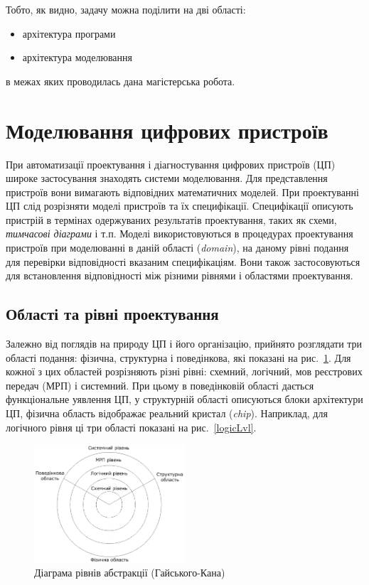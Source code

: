 \documentclass[12pt,a4paper]{article}
\begin{document}
Тобто, як видно, задачу можна поділити на дві області:
\begin{itemize}
  \item архітектура програми
  \item архітектура моделювання
\end{itemize}
в межах яких проводилась дана магістерська робота.

\clearpage

\section{Моделювання цифрових пристроїв}

При автоматизації проектування і діагностування цифрових пристроїв (ЦП) широке застосування знаходять системи моделювання. Для представлення пристроїв вони вимагають відповідних математичних моделей. При проектуванні ЦП слід розрізняти моделі пристроїв та їх специфікації. Специфікації описують пристрій в термінах одержуваних результатів проектування, таких як схеми, \emph{тимчасові діаграми} і т.п. Моделі використовуються в процедурах проектування пристроїв при моделюванні в даній області (\emph{domain}), на даному рівні подання для перевірки відповідності вказаним специфікаціям. Вони також застосовуються для встановлення відповідності між різними рівнями і областями проектування.

\subsection{Області та рівні проектування}

Залежно від поглядів на природу ЦП і його організацію, прийнято розглядати три області подання: фізична, структурна і поведінкова, які показані на рис.~\ref{abstrLvlDiag}. Для кожної з цих областей розрізняють різні рівні: схемний, логічний, мов реєстрових передач (МРП) і системний. При цьому в поведінковій області дається функціональне уявлення ЦП, у структурній області описуються блоки архітектури ЦП, фізична область відображає реальний кристал (\emph{chip}). Наприклад, для логічного рівня ці три області показані на рис.~\ref{logicLvl}.

\begin{figure}[h]
  \centering
    \includegraphics[width=0.5\textwidth]{Gajsky-and-Kuhn-diagram}
  \caption{Діаграма рівнів абстракції (Гайського-Кана)\label{abstrLvlDiag}}
\end{figure}
\end{document}

